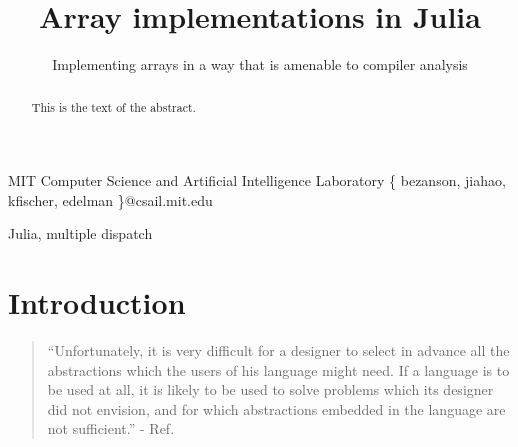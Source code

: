 \documentclass[preprint]{sigplanconf}
\begin{document}
\setlength{\pdfpageheight}{\paperheight}
\setlength{\pdfpagewidth}{\paperwidth}




\permissiontopublish             %


\title{Array implementations in Julia}
\subtitle{Implementing arrays in a way that is amenable to compiler analysis}

           {MIT Computer Science and Artificial Intelligence Laboratory}
           {\{ bezanson, jiahao, kfischer, edelman \}@csail.mit.edu}


\maketitle

\begin{abstract}
This is the text of the abstract.
\end{abstract}


\keywords
Julia, multiple dispatch

\section{Introduction}

\begin{quotation}
``Unfortunately, it is very difficult for a designer to select in advance all the abstractions which the users of his language might need. If a language is to be used at all, it is likely to be used to solve problems which its designer did not envision, and for which abstractions embedded in the language are not sufficient.'' - Ref. \cite{Liskov:1974pb}
\end{quotation}
\end{document}
